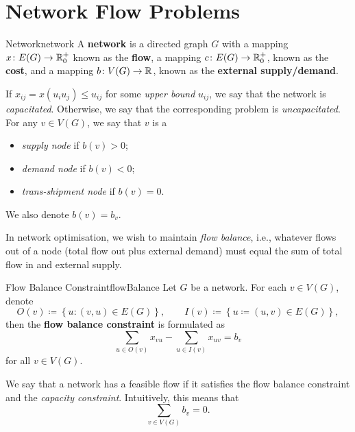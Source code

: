 \documentclass[math, code]{amznotes}
\theoremstyle{remark}
\begin{document}
\section{Network Flow Problems}
\begin{dfnbox}{Network}{network}
    A {\color{red} \textbf{network}} is a directed graph $G$ with a mapping $x \colon E(G) \to \mathbb{R}^+_0$ known as the {\color{red} \textbf{flow}}, a mapping $c \colon E(G) \to \mathbb{R}^+_0$, known as the {\color{red} \textbf{cost}}, and a mapping $b \colon V(G) \to \mathbb{R}$, known as the {\color{red} \textbf{external supply/demand}}.
\end{dfnbox}
If $x_{ij} = x(u_iu_j) \leq u_{ij}$ for some \textit{upper bound} $u_{ij}$, we say that the network is \textit{capacitated}. Otherwise, we say that the corresponding problem is \textit{uncapacitated}. For any $v \in V(G)$, we say that $v$ is a
\begin{itemize}
    \item \textit{supply node} if $b(v) > 0$;
    \item \textit{demand node} if $b(v) < 0$;
    \item \textit{trans-shipment node} if $b(v) = 0$.
\end{itemize}
We also denote $b(v) = b_v$.

In network optimisation, we wish to maintain \textit{flow balance}, i.e., whatever flows out of a node (total flow out plus external demand) must equal the sum of total flow in and external supply.
\begin{dfnbox}{Flow Balance Constraint}{flowBalance}
    Let $G$ be a network. For each $v \in V(G)$, denote 
    \begin{equation*}
        O(v) \coloneqq \left\{u \colon (v, u) \in E(G)\right\}, \qquad I(v) \coloneqq \left\{u \coloneqq (u, v) \in E(G)\right\},
    \end{equation*}
    then the {\color{red} \textbf{flow balance constraint}} is formulated as 
    \begin{equation*}
        \sum_{u \in O(v)}x_{vu} - \sum_{u \in I(v)}x_{uv} = b_v
    \end{equation*}
    for all $v \in V(G)$.
\end{dfnbox}
We say that a network has a feasible flow if it satisfies the flow balance constraint and the \textit{capacity constraint}. Intuitively, this means that 
\begin{equation*}
    \sum_{v \in V(G)}b_v = 0.
\end{equation*}
\end{document}
